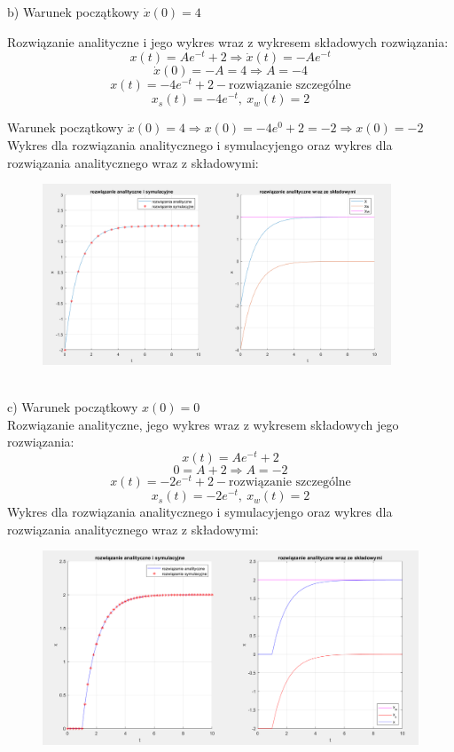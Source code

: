 \documentclass{article}
\begin{document}

b) Warunek początkowy $\dot{x}(0)=4$

Rozwiązanie analityczne i jego wykres wraz z wykresem składowych rozwiązania:
$$
x(t)=Ae^{-t}+2 \Rightarrow \dot{x}(t)=-Ae^{-t}
$$
$$
\dot{x}(0)=-A=4\Rightarrow A=-4
$$
$$
x(t)=-4e^{-t}+2-\text{rozwiązanie szczególne}
$$
$$
x_s(t)=-4e^{-t}, \ x_w(t)=2
$$

Warunek początkowy $\dot{x}(0)=4\Rightarrow x(0)=-4e^{0}+2=-2\Rightarrow x(0)=-2$
Wykres dla rozwiązania analitycznego i symulacyjengo oraz wykres dla rozwiązania analitycznego wraz z składowymi:
\begin{figure}[h!]
    \centering
    \includegraphics[width=0.928\textwidth]{POPRAWAwykresb.png}
    \label{fig:my_label}
\end{figure}
\\
c) Warunek początkowy $x(0)=0$\\

Rozwiązanie analityczne, jego wykres wraz z wykresem składowych jego rozwiązania:\\
$$
x(t)=Ae^{-t}+2
$$
$$
0=A+2 \Rightarrow A=-2
$$
$$
x(t)=-2e^{-t}+2-\text{rozwiązanie szczególne}
$$
$$
x_s(t)=-2e^{-t}, \  x_w(t)=2
$$
Wykres dla rozwiązania analitycznego i symulacyjengo oraz wykres dla rozwiązania analitycznego wraz z składowymi:
\begin{figure}[h!]
    \centering
    \includegraphics[width=\textwidth]{POPRAWAwykresC.png}
    \label{fig:my_label}
\end{figure}
\end{document}
